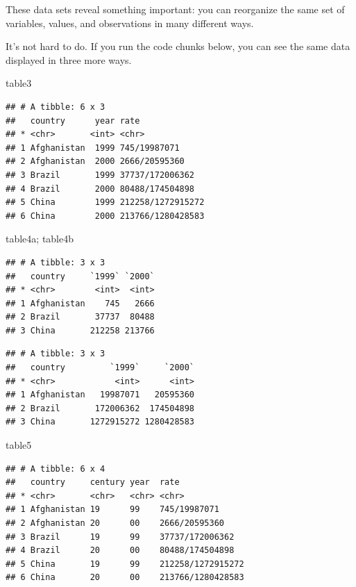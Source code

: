 \documentclass[
]{article}
\newenvironment{Shaded}{\begin{snugshade}}{\end{snugshade}}
\newcommand{\NormalTok}[1]{#1}
\begin{document}
These data sets reveal something important: you can reorganize the same
set of variables, values, and observations in many different ways.

It's not hard to do. If you run the code chunks below, you can see the
same data displayed in three more ways.

\begin{Shaded}
\begin{Highlighting}[]
\NormalTok{table3}
\end{Highlighting}
\end{Shaded}

\begin{verbatim}
## # A tibble: 6 x 3
##   country      year rate             
## * <chr>       <int> <chr>            
## 1 Afghanistan  1999 745/19987071     
## 2 Afghanistan  2000 2666/20595360    
## 3 Brazil       1999 37737/172006362  
## 4 Brazil       2000 80488/174504898  
## 5 China        1999 212258/1272915272
## 6 China        2000 213766/1280428583
\end{verbatim}

\begin{Shaded}
\begin{Highlighting}[]
\NormalTok{table4a; table4b}
\end{Highlighting}
\end{Shaded}

\begin{verbatim}
## # A tibble: 3 x 3
##   country     `1999` `2000`
## * <chr>        <int>  <int>
## 1 Afghanistan    745   2666
## 2 Brazil       37737  80488
## 3 China       212258 213766
\end{verbatim}

\begin{verbatim}
## # A tibble: 3 x 3
##   country         `1999`     `2000`
## * <chr>            <int>      <int>
## 1 Afghanistan   19987071   20595360
## 2 Brazil       172006362  174504898
## 3 China       1272915272 1280428583
\end{verbatim}

\begin{Shaded}
\begin{Highlighting}[]
\NormalTok{table5}
\end{Highlighting}
\end{Shaded}

\begin{verbatim}
## # A tibble: 6 x 4
##   country     century year  rate             
## * <chr>       <chr>   <chr> <chr>            
## 1 Afghanistan 19      99    745/19987071     
## 2 Afghanistan 20      00    2666/20595360    
## 3 Brazil      19      99    37737/172006362  
## 4 Brazil      20      00    80488/174504898  
## 5 China       19      99    212258/1272915272
## 6 China       20      00    213766/1280428583
\end{verbatim}
\end{document}
